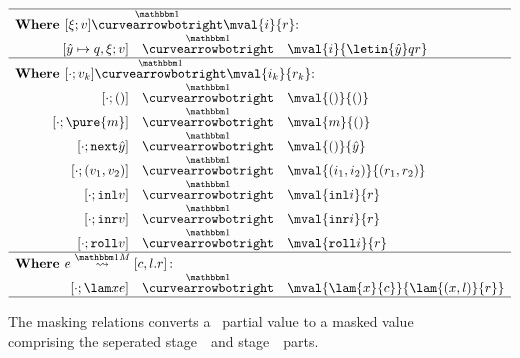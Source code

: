 \begin{figure}
\begin{abstrsyn}
\[\begin{array}{rrrl}
\hline
\multicolumn{4}{l}  {\text{\bf Where } [\xi;v] \vsplito \mval {i} {r} \text{:}}          \\
\hspace{0.25in} 
&[\hat y \mapsto q,\xi;v]  &\vsplito& \mval  {i}             {\letin {\hat y} q {r}}      \\
\hline
\multicolumn{4}{l}  {\text{\bf Where } [\cdot;v_k] \vsplito \mval {i_k} {r_k} \text{:}}  \\
&[\cdot;()]                &\vsplito& \mval  {()}            {()}                         \\
&[\cdot;\pure{m}]          &\vsplito& \mval  {m}             {()}                         \\
&[\cdot;\next{\hat y}]     &\vsplito& \mval  {()}            {\hat y}                     \\
&[\cdot;(v_1,v_2)]         &\vsplito& \mval  {(i_1,i_2)}     {(r_1,r_2)}                  \\
&[\cdot;\inl{v}]           &\vsplito& \mval  {\inl{i}}       {r}                          \\
&[\cdot;\inr{v}]           &\vsplito& \mval  {\inr{i}}       {r}                          \\
&[\cdot;\roll{v}]          &\vsplito& \mval  {\roll{i}}      {r}                          \\
\hline
\multicolumn{4}{l}  {\text{\bf Where } \splitone e A {c,l.r} \text{:}}                   \\
&[\cdot;\lam xe]           &\vsplito& \mval  {\lam {x} {c}}  {\lam {(x,l)} {r}}			\\
\hline
\end{array}\]
\end{abstrsyn}
\caption{The masking relations converts a \lang\ partial value to a masked value
comprising the seperated stage~\bbone\ and stage~\bbtwo\ parts.}
\label{fig:valMask}
\end{figure}
